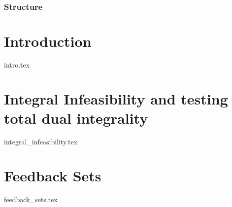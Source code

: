 \documentclass{beamer}
\begin{document}
    \begin{frame}
        \titlepage
    \end{frame}
    \begin{frame}
        \frametitle{Structure}
        \tableofcontents
    \end{frame}
    \section{Introduction}
    {intro.tex}

    \section{Integral Infeasibility and testing total dual integrality}
    {integral_infeasibility.tex}

    \section{Feedback Sets}
    {feedback_sets.tex}
\end{document}
